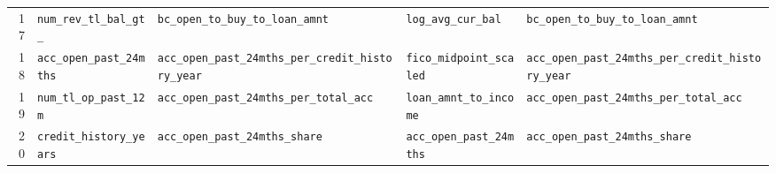 \documentclass[final,5p,twocolumn]{elsarticle}
\begin{document}
\begin{table}[htbp]
\begin{threeparttable}
\begin{tabular}{@{}rL{40mm}L{40mm}L{40mm}L{40mm}@{}}
17 & \texttt{num\_\allowbreak rev\_\allowbreak tl\_\allowbreak bal\_\allowbreak gt\_} & \texttt{bc\_\allowbreak open\_\allowbreak to\_\allowbreak buy\_\allowbreak to\_\allowbreak loan\_\allowbreak amnt} & \texttt{log\_\allowbreak avg\_\allowbreak cur\_\allowbreak bal} & \texttt{bc\_\allowbreak open\_\allowbreak to\_\allowbreak buy\_\allowbreak to\_\allowbreak loan\_\allowbreak amnt} \\
18 & \texttt{acc\_\allowbreak open\_\allowbreak past\_\allowbreak 24mths} & \texttt{acc\_\allowbreak open\_\allowbreak past\_\allowbreak 24mths\_\allowbreak per\_\allowbreak credit\_\allowbreak history\_\allowbreak year} & \texttt{fico\_\allowbreak midpoint\_\allowbreak scaled} & \texttt{acc\_\allowbreak open\_\allowbreak past\_\allowbreak 24mths\_\allowbreak per\_\allowbreak credit\_\allowbreak history\_\allowbreak year} \\
19 & \texttt{num\_\allowbreak tl\_\allowbreak op\_\allowbreak past\_\allowbreak 12m} & \texttt{acc\_\allowbreak open\_\allowbreak past\_\allowbreak 24mths\_\allowbreak per\_\allowbreak total\_\allowbreak acc} & \texttt{loan\_\allowbreak amnt\_\allowbreak to\_\allowbreak income} & \texttt{acc\_\allowbreak open\_\allowbreak past\_\allowbreak 24mths\_\allowbreak per\_\allowbreak total\_\allowbreak acc} \\
20 & \texttt{credit\_\allowbreak history\_\allowbreak years} & \texttt{acc\_\allowbreak open\_\allowbreak past\_\allowbreak 24mths\_\allowbreak share} & \texttt{acc\_\allowbreak open\_\allowbreak past\_\allowbreak 24mths} & \texttt{acc\_\allowbreak open\_\allowbreak past\_\allowbreak 24mths\_\allowbreak share} \\
\bottomrule
\end{tabular}
\end{threeparttable}
\end{table}
\end{document}
